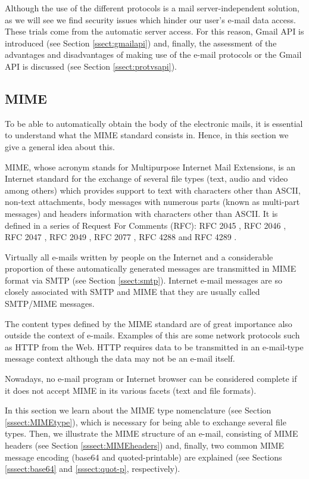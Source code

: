 Although the use of the different protocols is a mail server-independent solution, as we will see we find security issues which hinder our user's e-mail data access. These trials come from the automatic server access. For this reason, Gmail API is introduced (see Section \ref{ssect:gmailapi}) and, finally, the assessment of the advantages and disadvantages of making use of the e-mail protocols or the Gmail API is discussed (see Section \ref{ssect:protvsapi}).

\subsection{MIME} \label{ssect:mime}
To be able to automatically obtain the body of the electronic mails, it is essential to understand what the MIME standard consists in. Hence, in this section we give a general idea about this.

MIME, whose acronym stands for Multipurpose Internet Mail Extensions, is an Internet standard for the exchange of several file types (text, audio and video among others) which provides support to text with characters other than ASCII, non-text attachments, body messages with numerous parts (known as multi-part messages) and headers information with characters other than ASCII. It is defined in a series of Request For Comments (RFC): RFC 2045 \citep{rfc2045}, RFC 2046 \citep{rfc2046}, RFC 2047 \citep{rfc2047}, RFC 2049 \citep{rfc2049}, RFC 2077 \citep{rfc2077}, RFC 4288 \citep{rfc4288} and RFC 4289 \citep{rfc4289}.

Virtually all e-mails written by people on the Internet and a considerable proportion of these automatically generated messages are transmitted in MIME format via SMTP (see Section \ref{ssect:smtp}). Internet e-mail messages are so closely associated with SMTP and MIME that they are usually called SMTP/MIME messages.

The content types defined by the MIME standard are of great importance also outside the context of e-mails. Examples of this are some network protocols such as HTTP from the Web. HTTP requires data to be transmitted in an e-mail-type message context although the data may not be an e-mail itself.

Nowadays, no e-mail program or Internet browser can be considered complete if it does not accept MIME in its various facets (text and file formats).

In this section we learn about the MIME type nomenclature (see Section \ref{sssect:MIMEtype}), which is necessary for being able to exchange several file types. Then, we illustrate the MIME structure of an e-mail, consisting of MIME headers (see Section \ref{sssect:MIMEheaders}) and, finally, two common MIME message encoding (base64 and quoted-printable) are explained (see Sections \ref{sssect:base64} and \ref{sssect:quot-p}, respectively).

